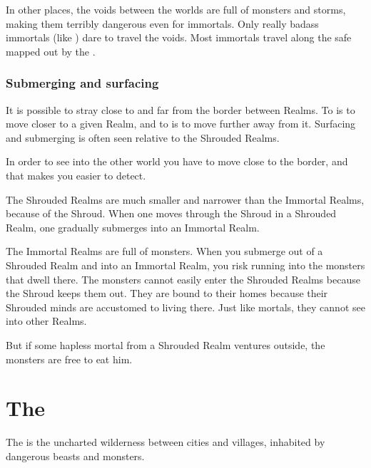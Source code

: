 In other places, the voids between the worlds are full of monsters and storms, making them terribly dangerous even for immortals. 
Only really badass immortals (like \QuessanthIshnaruchaefir) dare to travel the voids. 
Most immortals travel along the safe  mapped out by the \matrices. 





\subsubsection{Submerging and surfacing}
It is possible to stray close to and far from the border between Realms. 
To  is to move closer to a given Realm, and to  is to move further away from it. 
Surfacing and submerging is often seen relative to the Shrouded Realms. 

In order to see into the other world you have to move close to the border, and that makes you easier to detect. 

The Shrouded Realms are much smaller and narrower than the Immortal Realms, because of the Shroud. 
When one moves  through the Shroud in a Shrouded Realm, one gradually submerges into an Immortal Realm. 

The Immortal Realms are full of monsters. 
When you submerge out of a Shrouded Realm and into an Immortal Realm, you risk running into the monsters that dwell there. 
The monsters cannot easily enter the Shrouded Realms because the Shroud keeps them out. 
They are bound to their homes because their Shrouded minds are accustomed to living there. 
Just like mortals, they cannot see into other Realms. 

But if some hapless mortal from a Shrouded Realm ventures outside, the monsters are free to eat him. 














\section{The \Wylde}
The \Wylde{} is the uncharted wilderness between cities and villages, inhabited by dangerous beasts and monsters. 

